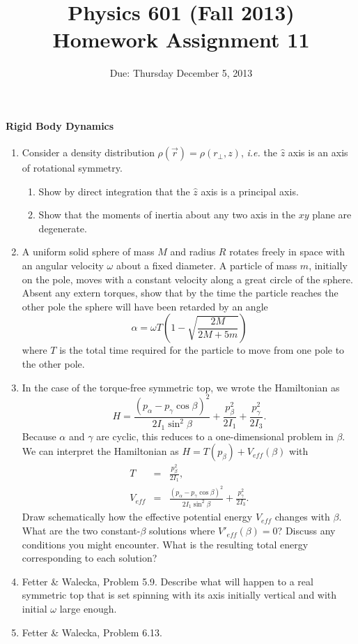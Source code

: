 \documentclass[letterpaper,11pt]{article}
\title{Physics 601 (Fall 2013) \\ Homework Assignment 11}
\date{Due: Thursday December 5, 2013}
\begin{document}
\maketitle

\paragraph*{Rigid Body Dynamics}
\begin{enumerate}
 \item Consider a density distribution $\rho(\vec{r}) = \rho(r_\perp,z)$, \textit{i.e.} the $\hat{z}$ axis is an axis of rotational symmetry.
 \begin{enumerate}
  \item Show by direct integration that the $\hat{z}$ axis is a principal axis.
  \item Show that the moments of inertia about any two axis in the $xy$ plane are degenerate.
 \end{enumerate}
 \item A uniform solid sphere of mass $M$ and radius $R$ rotates freely in space with an angular velocity $\omega$ about a fixed diameter.  A particle of mass $m$, initially on the pole, moves with a constant velocity along a great circle of the sphere.  Absent any extern torques, show that by the time the particle reaches the other pole the sphere will have been retarded by an angle
 \begin{equation*}
  \alpha = \omega T \left( 1 - \sqrt{\frac{2M}{2M + 5m}} \right)
 \end{equation*}
 where $T$ is the total time required for the particle to move from one pole to the other pole.
 \item In the case of the torque-free symmetric top, we wrote the Hamiltonian as
 \begin{equation*}
  H = \frac{(p_\alpha - p_\gamma\cos\beta)^2}{2 I_1 \sin^2\beta} + \frac{p^2_\beta}{2 I_1} + \frac{p^2_\gamma}{2 I_3}.
 \end{equation*}
 Because $\alpha$ and $\gamma$ are cyclic, this reduces to a one-dimensional problem in $\beta$.  We can interpret the Hamiltonian as $H = T(p_\beta) + V_{eff}(\beta)$ with
 \begin{eqnarray*}
  T & = & \frac{p^2_\beta}{2 I_1}, \\
  V_{eff} & = & \frac{(p_\alpha - p_\gamma\cos\beta)^2}{2 I_1 \sin^2\beta} + \frac{p^2_\gamma}{2 I_3}.
 \end{eqnarray*}
 Draw schematically how the effective potential energy $V_{eff}$ changes with $\beta$.  What are the two constant-$\beta$ solutions where $V'_{eff}(\beta) = 0$?  Discuss any conditions you might encounter.  What is the resulting total energy corresponding to each solution?
 \item Fetter \& Walecka, Problem 5.9.  Describe what will happen to a real symmetric top that is set spinning with its axis initially vertical and with initial $\omega$ large enough.
 \item Fetter \& Walecka, Problem 6.13.
\end{enumerate}
\end{document}
